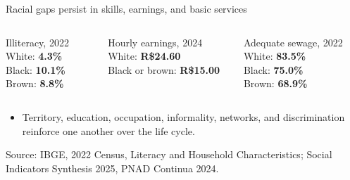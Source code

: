 \documentclass[10pt,aspectratio=169]{beamer}
\newcommand{\source}[1]{%
  \par\vfill{\tiny\color{MidGray}Source: #1}}
\begin{document}
\begin{frame}{Racial gaps persist in skills, earnings, and basic services}
  \begin{columns}[T,onlytextwidth]
      \begin{block}{Illiteracy, 2022}
        \centering
        White: \textbf{4.3\%}\\
        Black: \textbf{10.1\%}\\
        Brown: \textbf{8.8\%}
      \end{block}
      \begin{block}{Hourly earnings, 2024}
        \centering
        White: \textbf{R\$24.60}\\
        Black or brown: \textbf{R\$15.00}
      \end{block}
      \begin{block}{Adequate sewage, 2022}
        \centering
        White: \textbf{83.5\%}\\
        Black: \textbf{75.0\%}\\
        Brown: \textbf{68.9\%}
      \end{block}
  \end{columns}
  \vspace{.4cm}
  \begin{itemize}
    \item Territory, education, occupation, informality, networks, and discrimination reinforce one another over the life cycle.
  \end{itemize}
  \source{IBGE, 2022 Census, Literacy and Household Characteristics; Social Indicators Synthesis 2025, PNAD Continua 2024.}
\end{frame}
\end{document}
